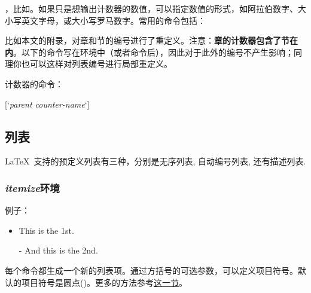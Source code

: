 ，比如。如果只是想输出计数器的数值，可以指定数值的形式，如阿拉伯数字、大小写英文字母，或大小写罗马数字。常用的命令包括：
\begin{latex}
\Alph \alph \Roman \roman
\end{latex}

比如本文的附录，对章和节的编号进行了重定义。注意：\textbf{章的计数器包含了节在内}。以下的命令写在环境中（或者命令后），因此对于此外的编号不产生影响；同理你也可以这样对列表编号进行局部重定义。
\begin{latex}
\renewcommand{\thechapter}{\Alph{chapter}}
\renewcommand{\thesection}
    {\thechapter-\arabic{section}}
\renewcommand{\thefootnote}{[\arabic{footnote}]}
\end{latex}

计数器的命令：
\begin{latex}
[`\textit{parent counter-name}`]
\end{latex}

\subsection{列表}
\LaTeX\ 支持的预定义列表有三种，分别是无序列表, 自动编号列表, 还有描述列表.

\subsubsection{\textit{itemize}环境}
例子：

\begin{codeshow}
\begin{itemize}
  \item This is the 1st.
  \item[-] And this is the 2nd.
\end{itemize}
\end{codeshow}

每个命令都生成一个新的列表项。通过方括号的可选参数，可以定义项目符号。默认的项目符号是圆点()。更多的方法参考\hyperref[sec:list]{这一节}。

